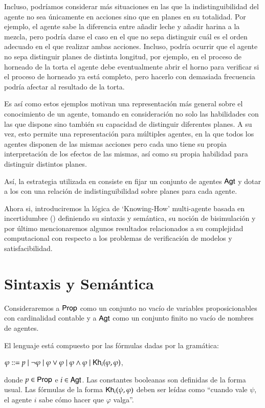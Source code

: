 Incluso, podríamos considerar más situaciones en las que la indistinguibilidad del agente no sea únicamente en acciones sino que en planes en su totalidad. Por ejemplo, 
el agente sabe la diferencia entre añadir leche y añadir harina a la mezcla, pero podría darse el caso en el que no sepa distinguir cuál es el orden adecuado en el que 
realizar ambas acciones. Incluso, podría ocurrir que el agente no sepa distinguir planes de distinta longitud, por ejemplo, en el proceso de horneado de la torta el agente 
debe eventualmente abrir el horno para verificar si el proceso de horneado ya está completo, pero hacerlo con demasiada frecuencia podría afectar al resultado de la torta.

Es así como estos ejemplos motivan una representación más general sobre el conocimiento de un agente, tomando en consideración no solo las habilidades con las que dispone sino 
también su capacidad de distinguir diferentes planes. A su vez, esto permite una representación para múltiples agentes, en la que todos los agentes disponen de las mismas acciones 
pero cada uno tiene su propia interpretación de los efectos de las mismas, así como su propia habilidad para distinguir distintos planes.

Así, la estrategia utilizada en \cite{ArecesFSV25,SaraviaPHD} consiste en fijar un conjunto de agentes ${\rm \sf Agt}$ y dotar a los \lts con una 
relación de indistinguibilidad sobre planes para cada agente.

Ahora si, introduciremos la lógica de `Knowing-How' multi-agente basada en incertidumbre (\KHilogic) definiendo su sintaxis y semántica, su noción de bisimulación y por último mencionaremos 
algunos resultados relacionados a su complejidad computacional con respecto a los problemas de verificación de modelos y satisfacibilidad.

\section{Sintaxis y Semántica}
Consideraremos a ${\rm \sf Prop}$ como un conjunto no vacío de variables proposicionables con cardinalidad contable 
y a ${\rm \sf Agt}$ como un conjunto finito no vacío de nombres de agentes.

\begin{definicion}
    El lenguaje \KHilogic está compuesto por las fórmulas dadas por la gramática:
    \begin{center}
        $\varphi ::= p \mid \neg \varphi \mid \varphi \vee \varphi \mid \varphi \wedge \varphi \mid \mathsf{Kh}_i(\varphi,\varphi)$,
    \end{center}
    donde $p \in {\rm \sf Prop}$ e $i \in {\rm \sf Agt}$. Las constantes booleanas son definidas de la forma usual. Las fórmulas de la forma 
    $\mathsf{Kh}_i(\psi, \varphi)$ deben ser leídas como ``cuando vale $\psi$, el agente $i$ sabe cómo hacer que $\varphi$ valga''.
\end{definicion}

